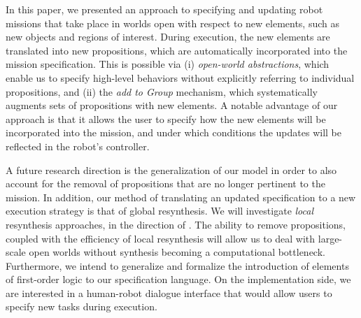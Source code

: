 In this paper, we presented an approach to specifying and updating robot missions that take place in worlds open with respect to new elements, such as new objects and regions of interest. During execution, the new elements are translated into new propositions, which are automatically incorporated into the mission specification. This is possible via (i) \emph{open-world abstractions}, which enable us to specify high-level behaviors without explicitly referring to individual propositions, and (ii) the \emph{add to Group} mechanism, which systematically augments sets of propositions with new elements. A notable advantage of our approach is that it allows the user to specify how the new elements will be incorporated into the mission, and under which conditions the updates will be reflected in the robot's controller.

A future research direction is the generalization of our model in order to also account for the removal of propositions that are no longer pertinent to the mission. 
In addition, our method of translating an updated specification to a new execution strategy is that of global resynthesis. We will investigate \emph{local} resynthesis approaches, in the direction of \cite{MurrayICRA2012, MurrayICRA2013a}.
The ability to remove propositions, coupled with the efficiency of local resynthesis will allow us to deal with large-scale open worlds without synthesis becoming a computational bottleneck.
Furthermore, we intend to generalize and formalize the introduction of elements of first-order logic to our specification language.
On the implementation side, we are interested in a human-robot dialogue interface that would allow users to specify new tasks during execution.
